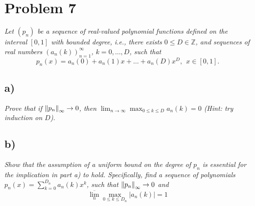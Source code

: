 \documentclass[12pt]{article}
\begin{document}
\section*{Problem 7}
{\it Let $(p_n)$ be a sequence of real-valued polynomial functions defined on the interval $[0,1]$ with bounded degree, i.e., there exists $0 \leq D \in \mathbb{Z}$, and sequences of real numbers $(a_n(k))_{n=1}^{\infty}$, $k = 0, \dots, D$, such that}
\begin{equation}
	\label{problem_7_polynomial}
	p_n(x) = a_n(0) + a_n(1)x + \dots + a_n(D)x^D,\ \ x \in [0,1].
\end{equation}

\subsection*{ a)}
{\it Prove that if $\norm{p_n}_\infty \rightarrow 0$, then $\lim_{n\rightarrow\infty}\max_{0\leq k\leq D}a_n(k) = 0$ (Hint: try induction on $D$).}

\subsection*{ b)}
{\it Show that the assumption of a uniform bound on the degree of $p_n$ is essential for the implication in part a) to hold.  Specifically, find a sequence of polynomials $p_n(x) = \sum_{k=0}^{D_n}a_n(k)x^k$, such that $\norm{p_n}_\infty \rightarrow 0$ and}
\begin{equation}
	\label{problem_7b_condition}
	\overline{\lim_n} \max_{0\leq k \leq D_n} |a_n(k)| = 1
\end{equation}
\end{document}
